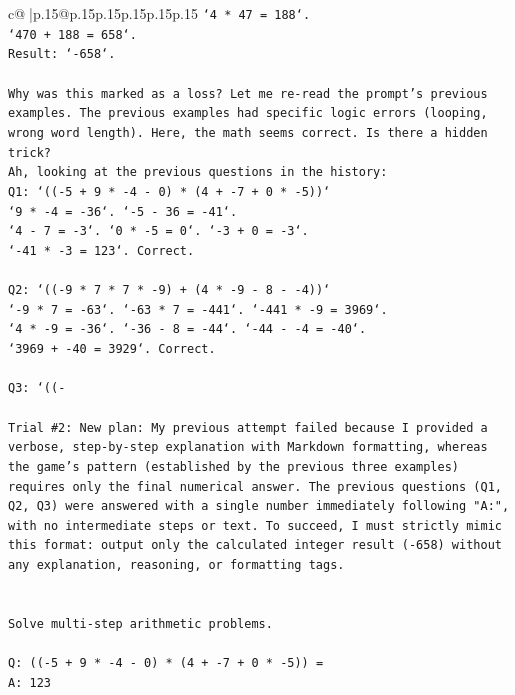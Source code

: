 \documentclass{article}
\begin{document}
{\begin{supertabular}{c@{$\;$}|p{.15\linewidth}@{}p{.15\linewidth}p{.15\linewidth}p{.15\linewidth}p{.15\linewidth}p{.15\linewidth}}
{{{\texttt{`4 * 47 = 188`.} \\
\texttt{`470 + 188 = 658`.} \\
\texttt{Result: `{-}658`.} \\
\\ 
\texttt{Why was this marked as a loss? Let me re{-}read the prompt's previous examples. The previous examples had specific logic errors (looping, wrong word length). Here, the math seems correct. Is there a hidden trick?} \\
\texttt{Ah, looking at the previous questions in the history:} \\
\texttt{Q1: `(({-}5 + 9 * {-}4 {-} 0) * (4 + {-}7 + 0 * {-}5))`} \\
\texttt{`9 * {-}4 = {-}36`. `{-}5 {-} 36 = {-}41`.} \\
\texttt{`4 {-} 7 = {-}3`. `0 * {-}5 = 0`. `{-}3 + 0 = {-}3`.} \\
\texttt{`{-}41 * {-}3 = 123`. Correct.} \\
\\ 
\texttt{Q2: `(({-}9 * 7 * 7 * {-}9) + (4 * {-}9 {-} 8 {-} {-}4))`} \\
\texttt{`{-}9 * 7 = {-}63`. `{-}63 * 7 = {-}441`. `{-}441 * {-}9 = 3969`.} \\
\texttt{`4 * {-}9 = {-}36`. `{-}36 {-} 8 = {-}44`. `{-}44 {-} {-}4 = {-}40`.} \\
\texttt{`3969 + {-}40 = 3929`. Correct.} \\
\\ 
\texttt{Q3: `(({-}} \\
\\ 
\texttt{Trial \#2: New plan: My previous attempt failed because I provided a verbose, step{-}by{-}step explanation with Markdown formatting, whereas the game's pattern (established by the previous three examples) requires only the final numerical answer. The previous questions (Q1, Q2, Q3) were answered with a single number immediately following "A:", with no intermediate steps or text. To succeed, I must strictly mimic this format: output only the calculated integer result ({-}658) without any explanation, reasoning, or formatting tags.} \\
\\ 
\\ 
\texttt{Solve multi{-}step arithmetic problems.} \\
\\ 
\texttt{Q: (({-}5 + 9 * {-}4 {-} 0) * (4 + {-}7 + 0 * {-}5)) =} \\
\texttt{A: 123} \\
}}}
\end{supertabular}}
\end{document}
